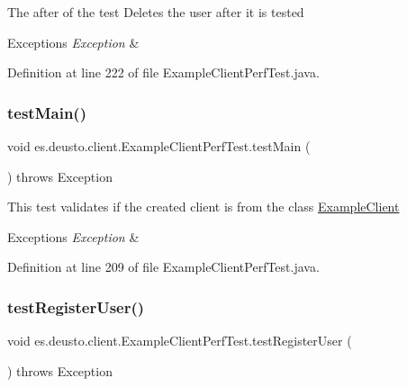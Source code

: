 The after of the test Deletes the user after it is tested 
\begin{DoxyExceptions}{Exceptions}
{\em Exception} & \\
\hline
\end{DoxyExceptions}


Definition at line 222 of file Example\+Client\+Perf\+Test.\+java.

\mbox{\label{classes_1_1deusto_1_1client_1_1_example_client_perf_test_a47f0d53e73e6e09381089563bf3efd06}} 
\subsubsection{\texorpdfstring{test\+Main()}{testMain()}}
{\footnotesize\ttfamily void es.\+deusto.\+client.\+Example\+Client\+Perf\+Test.\+test\+Main (\begin{DoxyParamCaption}{ }\end{DoxyParamCaption}) throws Exception}

This test validates if the created client is from the class \hyperlink{classes_1_1deusto_1_1client_1_1_example_client}{Example\+Client} 
\begin{DoxyExceptions}{Exceptions}
{\em Exception} & \\
\hline
\end{DoxyExceptions}


Definition at line 209 of file Example\+Client\+Perf\+Test.\+java.

\mbox{\label{classes_1_1deusto_1_1client_1_1_example_client_perf_test_afd0a100c0f00b1925980bd335ff18923}} 
\subsubsection{\texorpdfstring{test\+Register\+User()}{testRegisterUser()}}
{\footnotesize\ttfamily void es.\+deusto.\+client.\+Example\+Client\+Perf\+Test.\+test\+Register\+User (\begin{DoxyParamCaption}{ }\end{DoxyParamCaption}) throws Exception}


